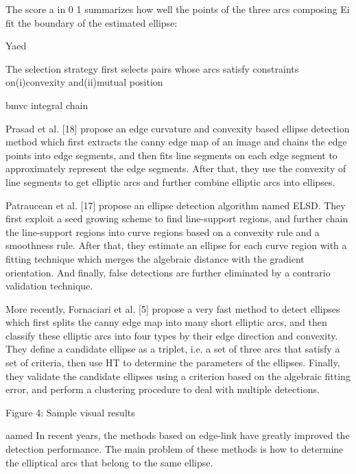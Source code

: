 \documentclass[a4paper]{report}
\begin{document}
The score a in 0 1
summarizes how well the points of the three arcs composing Ei fit the boundary of the estimated ellipse:


Yaed

The selection strategy first selects pairs whose arcs satisfy constraints on(i)convexity and(ii)mutual position



bmvc integral chain

Prasad et al. [18] propose an edge curvature and convexity
based ellipse detection method which first extracts the canny edge map of an image
and chains the edge points into edge segments, and then fits line segments on each edge
segment to approximately represent the edge segments. After that, they use the convexity of
line segments to get elliptic arcs and further combine elliptic arcs into ellipses. 

Patraucean
et al. [17] propose an ellipse detection algorithm named ELSD. They first exploit a seed
growing scheme to find line-support regions, and further chain the line-support regions into
curve regions based on a convexity rule and a smoothness rule. After that, they estimate an
ellipse for each curve region with a fitting technique which merges the algebraic distance
with the gradient orientation. And finally, false detections are further eliminated by a contrario
validation technique. 

More recently, Fornaciari et al. [5] propose a very fast method
to detect ellipses which first splits the canny edge map into many short elliptic arcs, and then
classify these elliptic arcs into four types by their edge direction and convexity. They define
a candidate ellipse as a triplet, i.e. a set of three arcs that satisfy a set of criteria, then use
HT to determine the parameters of the ellipses. Finally, they validate the candidate ellipses
using a criterion based on the algebraic fitting error, and perform a clustering procedure to
deal with multiple detections.


Figure 4: Sample visual results




aamed
In recent years, the methods based on edge-link have greatly
improved the detection performance. The main problem of
these methods is how to determine the elliptical arcs that
belong to the same ellipse.
\end{document}
